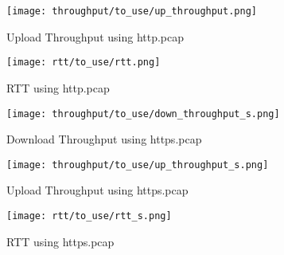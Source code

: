 \documentclass[12pt]{article}
\begin{document}
\begin{enumerate}
\begin{enumerate}
        \begin{figure}[h!]
            \centering
            \texttt{[image: throughput/to\_use/up\_throughput.png]}
            \caption{Upload Throughput using http.pcap}
        \end{figure}
        \begin{figure}[h!]
            \centering
            \texttt{[image: rtt/to\_use/rtt.png]}
            \caption{RTT using http.pcap}
        \end{figure}
        \begin{figure}[h!]
            \centering
            \texttt{[image: throughput/to\_use/down\_throughput\_s.png]}
            \caption{Download Throughput using https.pcap}
        \end{figure}
        \begin{figure}[h!]
            \centering
            \texttt{[image: throughput/to\_use/up\_throughput\_s.png]}
            \caption{Upload Throughput using https.pcap}
        \end{figure}
        \begin{figure}[h!]
            \centering
            \texttt{[image: rtt/to\_use/rtt\_s.png]}
            \caption{RTT using https.pcap}
        \end{figure}
    \end{enumerate}
    
\end{enumerate}
\end{document}
